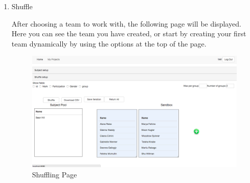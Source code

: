 \begin{enumerate}
\item Shuffle\par
After choosing a team to work with, the following page will be displayed.  Here you can see the team you have created, or start by creating your first team dynamically by using the options at the top of the page.\par
 \begin{figure}[H] 
	\centering
	\includegraphics[width=13cm]{./graphics/Shuffle.jpg}\par
	\caption{Shuffling Page}
\end{figure}


\end{enumerate}

